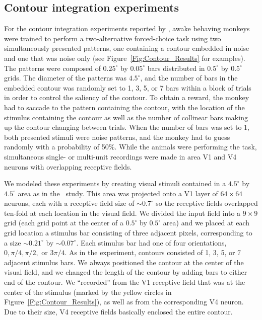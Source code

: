 \subsection{Contour integration experiments} 
\label{sec:contour_exp}

For the contour integration experiments reported by
\cite{Chen_etal14}, awake behaving monkeys were trained to perform a
two-alternative forced-choice task using two simultaneously presented
patterns, one containing a contour embedded in noise and one that was
noise only (see Figure~\ref{Fig:Contour_Results} for examples).  The
patterns were composed of $0.25^{\circ}$ by $0.05^{\circ}$ bars
distributed in $0.5^{\circ}$ by $0.5^{\circ}$ grids.  The diameter of
the patterns was $4.5^{\circ}$, and the number of bars in the embedded
contour was randomly set to 1, 3, 5, or 7 bars within a block of
trials in order to control the saliency of the contour.  To obtain a
reward, the monkey had to saccade to the pattern containing the
contour, with the location of the stimulus containing the contour as
well as the number of collinear bars making up the contour changing
between trials.  When the number of bars was set to 1, both presented
stimuli were noise patterns, and the monkey had to guess randomly with
a probability of 50\%.  While the animals were performing the task,
simultaneous single- or multi-unit recordings were made in area V1 and
V4 neurons with overlapping receptive fields.

We modeled these experiments by creating visual stimuli contained in a
$4.5^{\circ}$ by $4.5^{\circ}$ area as in the~\cite{Chen_etal14}
study. This area was projected onto a V1 layer of $64 \times 64$
neurons, each with a receptive field size of $\sim0.7^{\circ}$ so the
receptive fields overlapped ten-fold at each location in the visual
field.  We divided the input field into a $9 \times 9$ grid (each grid
point at the center of a $0.5^{\circ}$ by $0.5^{\circ}$ area) and we
placed at each grid location a stimulus bar 
consisting of three adjacent pixels, corresponding to a size
$\sim0.21^{\circ}$ by $\sim0.07^{\circ}$. 
Each stimulus bar had one of four orientations, $0, \pi/4, \pi/2,$ or
$3\pi/4$.  As in the experiment, contours consisted of 1, 3, 5, or 7 adjacent
stimulus bars. We always positioned the contour at the center of the
visual field, and we changed the length of the contour by adding bars
to either end of the contour. We ``recorded'' from the V1 receptive
field that was at the center of the stimulus (marked by the yellow
circles in Figure~\ref{Fig:Contour_Results}), as well as from the
corresponding V4 neuron.  Due to their size, V4 receptive fields
basically enclosed the entire contour.

